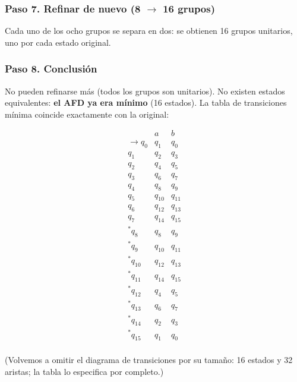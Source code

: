 \documentclass[12pt,letterpaper]{article}
\begin{document}
\begin{enumerate}[label=\arabic*.]
\begin{enumerate}
    \subsubsection*{Paso 7. Refinar de nuevo (8 $\to$ 16 grupos)}
    Cada uno de los ocho grupos se separa en dos: se obtienen 16 grupos unitarios, uno por cada estado original.

    \subsubsection*{Paso 8. Conclusión}
    No pueden refinarse más (todos los grupos son unitarios). No existen estados equivalentes: \textbf{el AFD ya era mínimo} (16 estados). La tabla de transiciones mínima coincide exactamente con la original:

    \medskip

    \[
    \begin{array}{c|cc}
      & a & b \\ \hline
      \rightarrow q_0 & q_1 & q_0 \\
      q_1 & q_2 & q_3 \\
      q_2 & q_4 & q_5 \\
      q_3 & q_6 & q_7 \\
      q_4 & q_8 & q_9 \\
      q_5 & q_{10} & q_{11} \\
      q_6 & q_{12} & q_{13} \\
      q_7 & q_{14} & q_{15} \\
      {}^*q_8 & q_8 & q_9 \\
      {}^*q_9 & q_{10} & q_{11} \\
      {}^*q_{10} & q_{12} & q_{13} \\
      {}^*q_{11} & q_{14} & q_{15} \\
      {}^*q_{12} & q_4 & q_5 \\
      {}^*q_{13} & q_6 & q_7 \\
      {}^*q_{14} & q_2 & q_3 \\
      {}^*q_{15} & q_1 & q_0 \\
    \end{array}
    \]

    \medskip
    \noindent
    (Volvemos a omitir el diagrama de transiciones por su tamaño: 16 estados y 32 aristas; la tabla lo especifica por completo.)
  \end{enumerate}
  
  \bigskip

  
\newpage


\end{enumerate}
\end{document}
